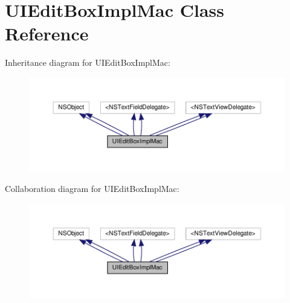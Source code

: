 \hypertarget{interfaceUIEditBoxImplMac}{}\section{U\+I\+Edit\+Box\+Impl\+Mac Class Reference}
\label{interfaceUIEditBoxImplMac}


Inheritance diagram for U\+I\+Edit\+Box\+Impl\+Mac\+:
\nopagebreak
\begin{figure}[H]
\begin{center}
\leavevmode
\includegraphics[width=350pt]{interfaceUIEditBoxImplMac__inherit__graph}
\end{center}
\end{figure}


Collaboration diagram for U\+I\+Edit\+Box\+Impl\+Mac\+:
\nopagebreak
\begin{figure}[H]
\begin{center}
\leavevmode
\includegraphics[width=350pt]{interfaceUIEditBoxImplMac__coll__graph}
\end{center}
\end{figure}
